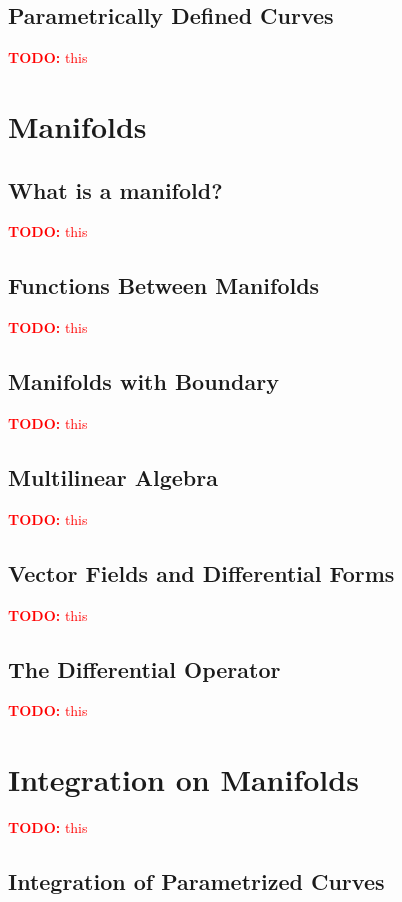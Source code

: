 \documentclass{article}
\newcommand{\TODO}[1]{\textcolor{red}{\textbf{TODO:} #1}}
\begin{document}
\subsection{Parametrically Defined Curves}

\TODO{this}

\section{Manifolds}

\subsection{What is a manifold?}

\TODO{this}

\subsection{Functions Between Manifolds}

\TODO{this}

\subsection{Manifolds with Boundary}

\TODO{this}

\subsection{Multilinear Algebra}

\TODO{this}

\subsection{Vector Fields and Differential Forms}

\TODO{this}

\subsection{The Differential Operator}

\TODO{this}

\section{Integration on Manifolds}

\TODO{this}

\subsection{Integration of Parametrized Curves}
\end{document}
